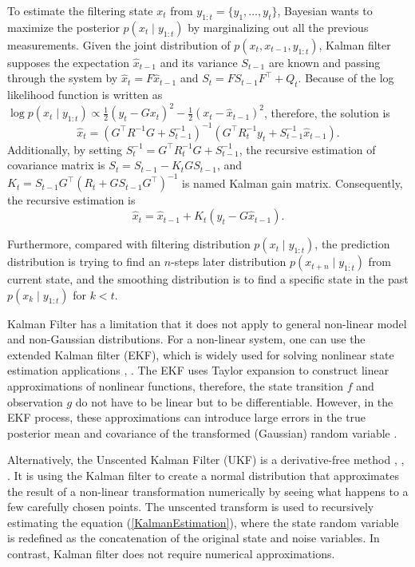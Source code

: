 To estimate the filtering state $x_t$ from $y_{1:t}=\{y_1,\ldots,y_t\}$, Bayesian wants to maximize the posterior $p(x_t\mid y_{1:t})$ by marginalizing out all the previous measurements. Given the joint distribution of $p(x_t,x_{t-1},y_{1:t})$, Kalman filter supposes the expectation $\hat{x}_{t-1}$ and its variance $S_{t-1}$ are known and passing through the system by $\hat{x}_t=F\hat{x}_{t-1}$ and $S_t=FS_{t-1}F^\top + Q_t$. Because of the log likelihood function is written as
$\log p(x_t\mid y_{1:t}) \propto \frac{1}{2}(y_t-Gx_t)^2-\frac{1}{2}(x_t-\hat{x}_{t-1})^2$,
therefore, the solution is 
\begin{equation*}
\hat{x}_t = \left(G^\top R^{-1}G+S_{t-1}^{-1}\right)^{-1}\left( G^\top R_t^{-1}y_t+S_{t-1}^{-1}\hat{x}_{t-1} \right).
\end{equation*}
Additionally, by setting $S_t^{-1} = G^\top R_t^{-1}G+S_{t-1}^{-1}$, the recursive estimation of covariance matrix is $S_t = S_{t-1} - K_t GS_{t-1}$, 
and $K_t = S_{t-1} G^\top (R_t +GS_{t-1}G^\top)^{-1}$ is named Kalman gain matrix. Consequently, the recursive estimation is 
\begin{equation}\label{KalmanEstimation}
\hat{x}_t = \hat{x}_{t-1}+K_t(y_t-G\hat{x}_{t-1}).
\end{equation}

Furthermore, compared with filtering distribution $p(x_t\mid y_{1:t})$, the prediction distribution is trying to find an $n$-steps later distribution $p(x_{t+n}\mid y_{1:t})$ from current state, and the smoothing distribution is to find a specific state in the past $p(x_k\mid y_{1:t})$ for $k<t$. 

Kalman Filter has a limitation that it does not apply to general non-linear model and non-Gaussian distributions. For a non-linear system, one can use the extended Kalman filter (EKF), which is widely used for solving nonlinear state estimation applications \cite{gelb1974applied}, \cite{bar1993estimation}. The EKF uses Taylor expansion to construct linear approximations of nonlinear functions, therefore, the state transition $f$ and observation $g$ do not have to be linear but to be differentiable. However, in the EKF process, these approximations can introduce large errors in the true posterior mean and covariance of the transformed (Gaussian) random variable \cite{wan2000unscented}. 

Alternatively, the Unscented Kalman Filter (UKF) is a derivative-free method \cite{julier1997new}, \cite{wan2000unscented}, \cite{gyorgy2014unscented}. It is using the Kalman filter to create a normal distribution that approximates the result of a non-linear transformation numerically by seeing what happens to a few carefully chosen points. The unscented transform is used to recursively estimating the equation (\ref{KalmanEstimation}), where the state random variable is redefined as the concatenation of the original state and noise variables. In contrast, Kalman filter does not require numerical approximations. 

